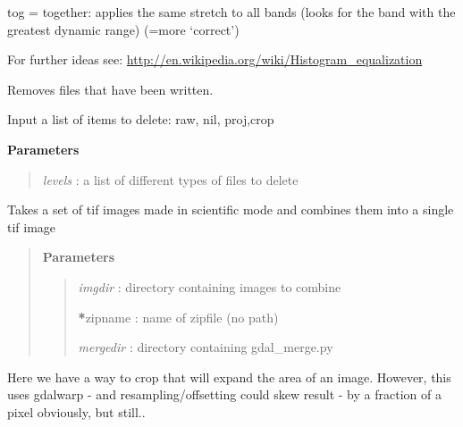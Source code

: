 \documentclass[letterpaper,10pt,openany,oneside]{sphinxmanual}
\begin{document}
\begin{fulllineitems}
\begin{fulllineitems}
tog = together: applies the same stretch to all bands (looks for the band with the greatest dynamic range) (=more `correct')

For further ideas see: \href{http://en.wikipedia.org/wiki/Histogram\_equalization}{http://en.wikipedia.org/wiki/Histogram\_equalization}

\end{fulllineitems}


\begin{fulllineitems}
\label{code:Image.Image.cleanFiles}
Removes files that have been written.

Input a list of items to delete: raw, nil, proj,crop

\textbf{Parameters}
\begin{quote}

\emph{levels} : a list of different types of files to delete
\end{quote}

\end{fulllineitems}


\begin{fulllineitems}
\label{code:Image.Image.combineTif}
Takes a set of tif images made in scientific mode and combines
them into a single tif image
\begin{quote}

\textbf{Parameters}
\begin{quote}

\emph{imgdir}   : directory containing images to combine

{\color{red}\bfseries{}*}zipname   : name of zipfile (no path)

\emph{mergedir} : directory containing gdal\_merge.py
\end{quote}
\end{quote}

\end{fulllineitems}


\begin{fulllineitems}
\label{code:Image.Image.cropBig}
Here we have a way to crop that will expand the area of an image.
However, this uses gdalwarp - and resampling/offsetting could skew result - by a fraction of a pixel obviously, but still..


\end{fulllineitems}
\end{fulllineitems}
\end{document}
